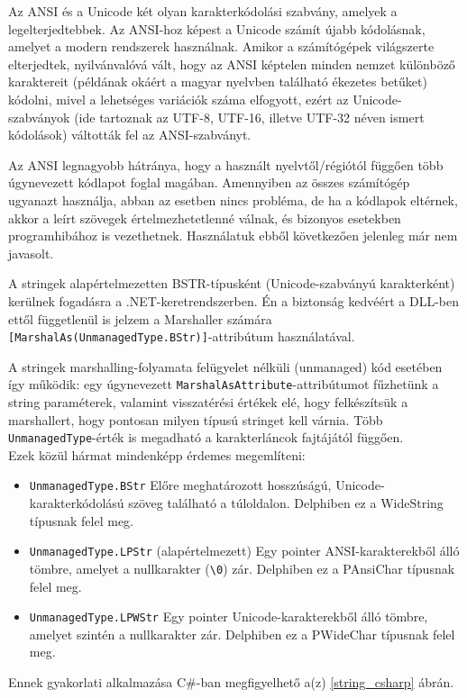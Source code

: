 \documentclass[tocnopagenum]{thesis-ekf}
\begin{document}
	Az ANSI és a Unicode két olyan karakterkódolási szabvány, amelyek a legelterjedtebbek. Az ANSI-hoz képest a Unicode számít újabb kódolásnak, amelyet a modern rendszerek használnak. Amikor a számítógépek világszerte elterjedtek, nyilvánvalóvá vált, hogy az ANSI képtelen minden nemzet különböző karaktereit (példának okáért a magyar nyelvben található ékezetes betűket) kódolni, mivel a lehetséges variációk száma elfogyott, ezért az Unicode-szabványok (ide tartoznak az UTF-8, UTF-16, illetve UTF-32 néven ismert kódolások) váltották fel az ANSI-szabványt.
	
	Az ANSI legnagyobb hátránya, hogy a használt nyelvtől/régiótól függően több úgynevezett kódlapot foglal magában. Amennyiben az összes számítógép ugyanazt használja, abban az esetben nincs probléma, de ha a kódlapok eltérnek, akkor a leírt szövegek értelmezhetetlenné válnak, és bizonyos esetekben programhibához is vezethetnek. Használatuk ebből következően jelenleg már nem javasolt. \cite{ansi_unicode}
	
	A stringek alapértelmezetten BSTR-típusként (Unicode-szabványú karakterként) kerülnek fogadásra a .NET-keretrendszerben. Én a biztonság kedvéért a DLL-ben ettől függetlenül is jelzem a Marshaller számára \verb*|[MarshalAs(UnmanagedType.BStr)]|-attribútum használatával.
	
	A stringek marshalling-folyamata felügyelet nélküli (unmanaged) kód esetében így működik: egy úgynevezett \verb*|MarshalAsAttribute|-attribútumot fűzhetünk a string paraméterek, valamint visszatérési értékek elé, hogy felkészítsük a marshallert, hogy pontosan milyen típusú stringet kell várnia. Több \verb*|UnmanagedType|-érték is megadható a karakterláncok fajtájától függően.\cite{marshalling_strings}\\
	Ezek közül hármat mindenképp érdemes megemlíteni:
	\begin{itemize}
		\item \verb*|UnmanagedType.BStr| Előre meghatározott hosszúságú, Unicode-karakterkódolású szöveg található a túloldalon. Delphiben ez a WideString típusnak felel meg.
		\item \verb*|UnmanagedType.LPStr| (alapértelmezett) Egy pointer ANSI-karakterekből álló tömbre, amelyet a nullkarakter (\verb*|\0|) zár. Delphiben ez a PAnsiChar típusnak felel meg. 
		\item \verb*|UnmanagedType.LPWStr| Egy pointer Unicode-karakterekből álló tömbre, amelyet szintén a nullkarakter zár. Delphiben ez a PWideChar típusnak felel meg.
	\end{itemize}
	Ennek gyakorlati alkalmazása C\#-ban megfigyelhető a(z) \ref{string_csharp} ábrán.
\end{document}
